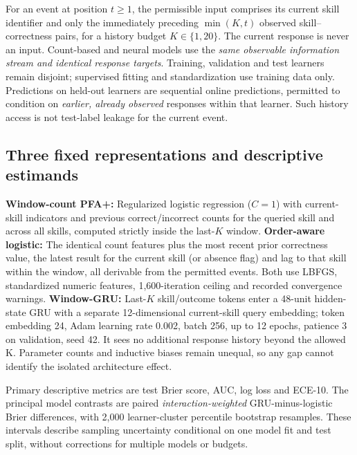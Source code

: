 \documentclass[11pt,a4paper]{article}
\begin{document}
For an event at position $t\geq1$, the permissible input comprises its current skill identifier and only the immediately preceding $\min(K,t)$ observed skill--correctness pairs, for a history budget $K\in\{1,20\}$. The current response is never an input. Count-based and neural models use the \emph{same observable information stream and identical response targets}. Training, validation and test learners remain disjoint; supervised fitting and standardization use training data only. Predictions on held-out learners are sequential online predictions, permitted to condition on \emph{earlier, already observed} responses within that learner. Such history access is not test-label leakage for the current event.

\subsection{Three fixed representations and descriptive estimands}
\textbf{Window-count PFA+:} Regularized logistic regression ($C=1$) with current-skill indicators and previous correct/incorrect counts for the queried skill and across all skills, computed strictly inside the last-$K$ window. \textbf{Order-aware logistic:} The identical count features plus the most recent prior correctness value, the latest result for the current skill (or absence flag) and lag to that skill within the window, all derivable from the permitted events. Both use LBFGS, standardized numeric features, 1,600-iteration ceiling and recorded convergence warnings. \textbf{Window-GRU:} Last-$K$ skill/outcome tokens enter a 48-unit hidden-state GRU with a separate 12-dimensional current-skill query embedding; token embedding 24, Adam learning rate 0.002, batch 256, up to 12 epochs, patience 3 on validation, seed 42. It sees no additional response history beyond the allowed K. Parameter counts and inductive biases remain unequal, so any gap cannot identify the isolated architecture effect.

Primary descriptive metrics are test Brier score, AUC, log loss and ECE-10. The principal model contrasts are paired \emph{interaction-weighted} GRU-minus-logistic Brier differences, with 2,000 learner-cluster percentile bootstrap resamples. These intervals describe sampling uncertainty conditional on one model fit and test split, without corrections for multiple models or budgets.
\end{document}

